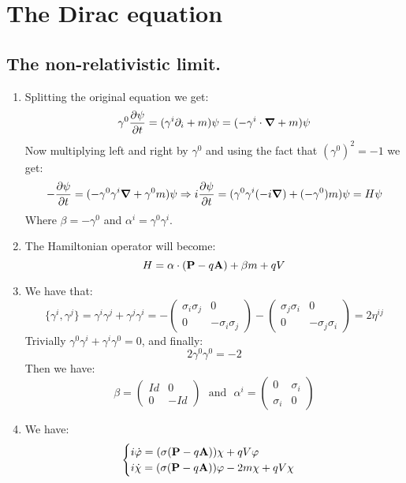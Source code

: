 \documentclass[10pt,a4paper]{book}
\begin{document}
\chapter{The Dirac equation}

\section{The non-relativistic limit.}

\begin{enumerate}

\item Splitting the original equation we get:
\[
\gamma^0 \pdv{ \psi }{t} = (\gamma^i \partial_i + m)\psi  = ( - \gamma^i \cdot \grad + m ) \psi 
\]
Now multiplying left and right by $\gamma^0$ and using the fact that $(\gamma^0)^2 = - 1$ we get:
\[
-\pdv{\psi}{t} = (- \gamma^0 \gamma^{i} \grad + \gamma^0 m) \psi  \Rightarrow i \pdv{\psi}{t} = (\gamma^0 \gamma^i (- i \grad) + (-\gamma^0) m) \psi = H \psi
\]
Where $\beta = -\gamma^0$ and $\alpha^i = \gamma^0 \gamma^i$.

\item The Hamiltonian operator will become:
\[
H = \vb{\alpha} \cdot (\vb{P} - q \vb{A}) + \beta m + qV 
\]

\item We have that:
\[
\{ \gamma^i, \gamma^j \} = \gamma^i \gamma^j + \gamma^j \gamma^i = - \begin{pmatrix}
\sigma_i \sigma_j & 0\\
0 & - \sigma_i \sigma_j
\end{pmatrix} - \begin{pmatrix}
\sigma_j \sigma_i & 0\\
0 & - \sigma_j \sigma_i
\end{pmatrix}  =  2 \eta^{ij}
\]
Trivially $\gamma^0\gamma^i + \gamma^i \gamma^0 = 0$, and finally:
\[
2 \gamma^0 \gamma^0 = - 2
\]
Then we have:
\[
\beta = \begin{pmatrix}
Id & 0 \\
0 & - Id
\end{pmatrix}
\mbox{~~and~~}
\alpha^i = \begin{pmatrix}
0 & \sigma_i\\
\sigma_i & 0
\end{pmatrix}
\]

\item We have:
\[
\begin{cases}
i \dot{\varphi} = (\vb{\sigma}(\vb{P} - q \vb{A})) \chi + q V \varphi\\
i \dot{\chi} = (\vb{\sigma}(\vb{P} - q \vb{A})) \varphi - 2m \chi + qV \chi
\end{cases}
\]


\end{enumerate}
\end{document}
